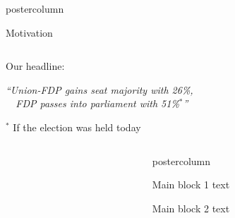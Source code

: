 \documentclass[final,hyperref={pdfpagelabels=false}]{beamer}
\newcommand{\darkgray}[1]{\textcolor{koaladarkgray}{#1}}
\newcommand{\lightgray}[1]{\textcolor{koalagray}{#1}}
\newcommand*\circled[1]{\tikz[baseline=(char.base)]{
\node[shape=circle,draw,inner sep=2pt] (char) {#1};}}
\newlength{\columnheight}
\begin{document}
\begin{frame}
\begin{columns}
\begin{column}{1\textwidth}
\begin{beamercolorbox}[center,wd=\textwidth]{postercolumn}
\begin{minipage}[T]{.95\textwidth}
\begin{block}{\footnotesize Motivation}
{{\begin{minipage}{0.94\textwidth}
\begin{columns}[t]
\begin{column}{.29\textwidth}
  \begin{mdleftgreen}
  \begin{minipage}{\textwidth}
  \lightgray{\footnotesize Our headline:}
  \begin{center}\centering
  \darkgray{\textit{
  ``Union-FDP gains seat majority with 26\%, \ \ \\[0.1cm] \ \ FDP passes into parliament with 51\%$^*$''
  }}
  \end{center}
  \vspace{-0.7ex}
  \lightgray{\tiny ${}^*$ If the election was held today}
  \end{minipage}
  \end{mdleftgreen}
  \end{column}
  \end{columns}
  \end{minipage}
  }
  }

  \vspace{1ex}
\end{block}
\end{minipage}
\end{beamercolorbox}



\vspace{2ex}
\begin{columns}[T]

\begin{column}{.016\textwidth}
\end{column}

\begin{column}{.484\textwidth}
\begin{beamercolorbox}[center,wd=\textwidth]{postercolumn}
\begin{minipage}[T]{.95\textwidth}  %

\begin{block}{\footnotesize \circled{1} Main block 1}
text
\end{block}


\begin{block}{\footnotesize \circled{2} Main block 2}
text
\end{block}




\end{minipage}
\end{beamercolorbox}
\end{column}
\end{columns}
\end{column}
\end{columns}
\end{frame}
\end{document}

